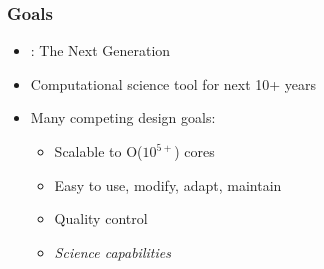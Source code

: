     \begin{frame}[fragile] \frametitle{Goals}
      \begin{itemize}
        \item \enzo: The Next Generation
        \item Computational science tool for next 10+ years
        \item Many competing design goals:
        \begin{itemize}
          \item Scalable to O($10^{5+}$)  cores
          \item Easy to use, modify, adapt, maintain
          \item Quality control
          \item \textit{Science capabilities}
        \end{itemize}
      \end{itemize}
\end{frame}
